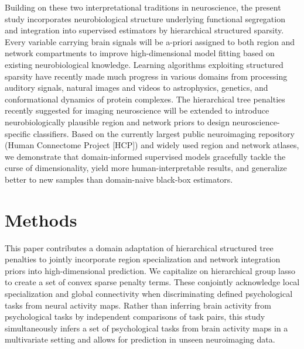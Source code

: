 \documentclass[runningheads,a4paper]{llncs}
\begin{document}
Building on these two
interpretational traditions in neuroscience,
the present study incorporates
neurobiological structure underlying
functional segregation and integration
into supervised estimators
by hierarchical structured sparsity.
Every variable carrying brain signals
will be a-priori assigned to both region and network compartments to
improve high-dimensional model fitting based on
existing neurobiological knowledge.
%
Learning algorithms
exploiting structured sparsity 
have recently made much progress in various domains
from processing auditory signals,
natural images %
and
videos
to
astrophysics, %
genetics, %
and
conformational dynamics of protein complexes. %
%
The hierarchical tree penalties recently suggested for imaging neuroscience
\cite{jenatton2012multi} will be extended to
introduce neurobiologically plausible region and network priors
to design neuroscience-specific classifiers.
%
Based on the currently largest public neuroimaging repository
(Human Connectome Project [HCP])
and widely used region \cite{crad12} and network \cite{smith2009} atlases,
we demonstrate that domain-informed supervised models
gracefully tackle the curse of dimensionality,
yield more human-interpretable results,
and generalize better to new samples
than domain-naive black-box estimators.
\nopagebreak
\section*{Methods}
This paper contributes a domain adaptation of hierarchical structured
tree penalties to jointly incorporate region 
specialization and network integration priors into high-dimensional 
prediction.
We capitalize on hierarchical group lasso
to create a set of convex sparse penalty terms.
These conjointly acknowledge local specialization and 
global connectivity when discriminating defined psychological tasks
from neural activity maps.
Rather than inferring brain activity from psychological tasks
by independent comparisons of task pairs,
this study simultaneously infers
a set of psychological tasks from brain activity maps
in a multivariate setting and allows for
prediction in unseen neuroimaging data.
%
\end{document}
